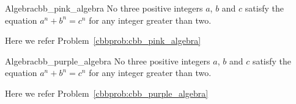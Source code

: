 \documentclass[11pt, letterpaper]{../exercise}
\begin{document}
    \begin{cbbpinkproblem}{Algebra}{cbb_pink_algebra}
    No three positive integers \(a\), \(b\) and \(c\) satisfy the equation
    \(a^{n} + b^{n} = c^{n}\) for any integer greater than two.
    \end{cbbpinkproblem}
    Here we refer Problem~\ref{cbbprob:cbb_pink_algebra}

    \begin{cbbpurpleproblem}{Algebra}{cbb_purple_algebra}
    No three positive integers \(a\), \(b\) and \(c\) satisfy the equation
    \(a^{n} + b^{n} = c^{n}\) for any integer greater than two.
    \end{cbbpurpleproblem}
    Here we refer Problem~\ref{cbbprob:cbb_purple_algebra}

\end{document}
